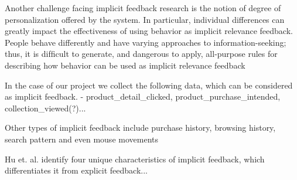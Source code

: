 Another challenge facing implicit feedback research is the notion of degree of
personalization offered by the system. In particular, individual differences can greatly
impact the effectiveness of using behavior as implicit relevance feedback. People behave
differently and have varying approaches to information-seeking; thus, it is difﬁcult to
generate, and dangerous to apply, all-purpose rules for describing how behavior can be
used as implicit relevance feedback


In the case of our project we collect the following data, which can be considered as implicit feedback.
- product_detail_clicked, product_purchase_intended, collection_viewed(?)...

Other types of implicit feedback include purchase history, browsing
history, search pattern and even mouse movements

Hu et. al. \cite{Hu2008} identify four unique characteristics of implicit feedback, which differentiates it from explicit feedback...

